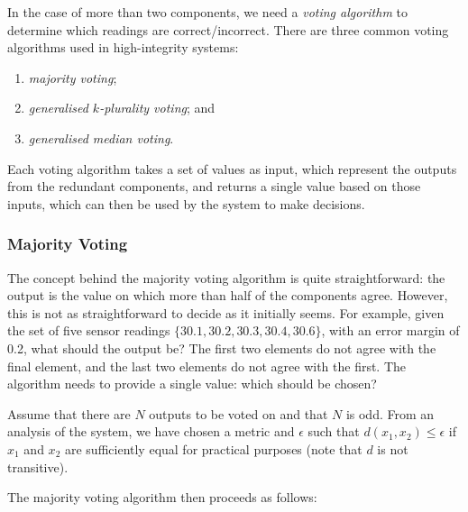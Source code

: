 In the case of more than two components, we need a \emph{voting algorithm} to determine which readings are correct/incorrect. There are three common voting algorithms used in high-integrity systems:

\begin{enumerate}
 \item \emph{majority voting};
 \item \emph{generalised $k$-plurality voting}; and
 \item \emph{generalised median voting}.
\end{enumerate}

Each voting algorithm takes a set of values as input, which represent the outputs from the redundant components, and returns a single value based on those inputs, which can then be used by the system to make decisions.

\subsubsection*{Majority Voting}

The concept behind the majority voting algorithm is quite straightforward: the output is the value on which more than half of the components agree. However, this is not as straightforward to decide as it initially seems. For example, given the set of five sensor readings $\{30.1, 30.2, 30.3, 30.4, 30.6\}$, with an error margin of 0.2, what should the output be? The first two elements do not agree with the final element, and the last two elements do not agree with the first. The algorithm needs to provide a single value: which should be chosen?


Assume that there are \(N\) outputs to be voted on and that \(N\) is odd.  From an analysis of the system, we have chosen a metric and \(\epsilon\) such that \(d(x_1,x_2)\leq\epsilon\) if \(x_1\) and \(x_2\) are sufficiently equal for practical purposes (note that $d$ is not transitive).

The majority voting algorithm then proceeds as follows:

